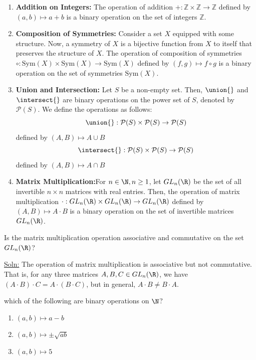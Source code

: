 \documentclass[openany]{book}
\begin{document}
\begin{enumerate}
    \item \textbf{Addition on Integers:} The operation of addition \( + : \mathbb{Z} \times \mathbb{Z} \to \mathbb{Z} \) defined by \( (a, b) \mapsto a + b \) is a binary operation on the set of integers \( \mathbb{Z} \).
    \item \textbf{Composition of Symmetries:} Consider a set $X$ equipped with some structure. Now, a symmetry of $X$ is a bijective function from $X$ to itself that preserves the structure of $X$. The operation of composition of symmetries \( \circ : \text{Sym}(X) \times \text{Sym}(X) \to \text{Sym}(X) \) defined by \( (f, g) \mapsto f \circ g \) is a binary operation on the set of symmetries \( \text{Sym}(X) \).
    \item \textbf{Union and Intersection:} Let $S$ be a non-empty set. Then, $\union{}$ and $\intersect{}$ are binary operations on the power set of $S$, denoted by $\mathcal{P}(S)$. We define the operations as follows:
    \[\union{} : \mathcal{P}(S) \times \mathcal{P}(S) \to \mathcal{P}(S)\] defined by \( (A, B) \mapsto A \cup B \)
    \[\intersect{} : \mathcal{P}(S) \times \mathcal{P}(S) \to \mathcal{P}(S)\] defined by \( (A, B) \mapsto A \cap B \)
    \item \textbf{Matrix Multiplication:}For $n \in \N, n\geq 1$, let $GL_n(\R)$ be the set of all invertible $n \times n$ matrices with real entries. Then, the operation of matrix multiplication \( \cdot : GL_n(\R) \times GL_n(\R) \to GL_n(\R) \) defined by \( (A, B) \mapsto A \cdot B \) is a binary operation on the set of invertible matrices \( GL_n(\R) \).
\end{enumerate}
\begin{exercise}
    Is the matrix multiplication operation associative and commutative on the set \( GL_n(\R) \)?
\end{exercise}
\underline{Soln:} The operation of matrix multiplication is associative but not commutative. That is, for any three matrices \( A, B, C \in GL_n(\R) \), we have \( (A \cdot B) \cdot C = A \cdot (B \cdot C) \), but in general, \( A \cdot B \neq B \cdot A \). \\
\begin{exercise}
    which of the following are binary operations on $\N$?
    \begin{enumerate}
        \item \( (a, b) \mapsto a - b \)
        \item \( (a, b) \mapsto \pm \sqrt{ab} \)
        \item \( (a, b) \mapsto 5 \)
    \end{enumerate}
\end{exercise}
\end{document}
